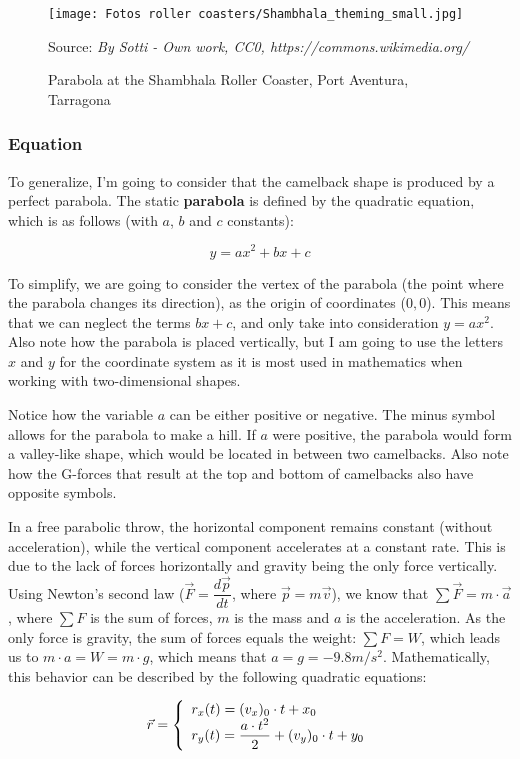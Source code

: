 \documentclass[12pt,twoside,a4paper]{article}
\newcommand{\source}[1]{\caption*{Source: \textit{#1}} }
\begin{document}
	\begin{figure}[H]
	\centering
	\texttt{[image: Fotos roller coasters/Shambhala\_theming\_small.jpg]}
	\caption{Parabola at the Shambhala Roller Coaster, Port Aventura, Tarragona}
	\label{fig:parabola2}
	\source{By Sotti - Own work, CC0, https://commons.wikimedia.org/}
	\end{figure}
	
	\subsubsection{Equation}
	To generalize, I'm going to consider that the camelback shape is produced by a perfect parabola. The static \textbf{parabola} is defined by the quadratic equation, which is as follows (with $a$, $b$ and $c$ constants):
		
	$$y = ax^2 + bx + c$$
	
	To simplify, we are going to consider the vertex of the parabola (the point where the parabola changes its direction), as the origin of coordinates ($0, 0$). This means that we can neglect the terms $bx + c$, and only take into consideration $y = ax^2$. Also note how the parabola is placed vertically, but I am going to use the letters $x$ and $y$ for the coordinate system as it is most used in mathematics when working with two-dimensional shapes.
	
	Notice how the variable $a$ can be either positive or negative. The minus symbol allows for the parabola to make a hill. If $a$ were positive, the parabola would form a valley-like shape, which would be located in between two camelbacks. Also note how the G-forces that result at the top and bottom of camelbacks also have opposite symbols.
	
	In a free parabolic throw, the horizontal component remains constant (without acceleration), while the vertical component accelerates at a constant rate. This is due to the lack of forces horizontally and gravity being the only force vertically. Using Newton's second law ($\vec{F} = \dfrac{d\vec{p}}{dt}$, where $\vec{p} = m \vec{v}$), we know that $\sum \vec{F} = m \cdot \vec{a}$, where $\sum F$ is the sum of forces, $m$ is the mass and $a$ is the acceleration. As the only force is gravity, the sum of forces equals the weight: $\sum F = W$, which leads us to $m \cdot a = W = m \cdot g$, which means that $a = g = -9.8 m/s^2$. Mathematically, this behavior can be described by the following quadratic equations:
	
	$$\vec{r} = \left\{\begin{array}{l} r_x (t) = (v_x)_0 \cdot t + x_0 \cr r_y (t) = \dfrac{a \cdot t^2}{2} + (v_y)_0 \cdot t + y_0 \end{array}\right.$$
	
\end{document}
